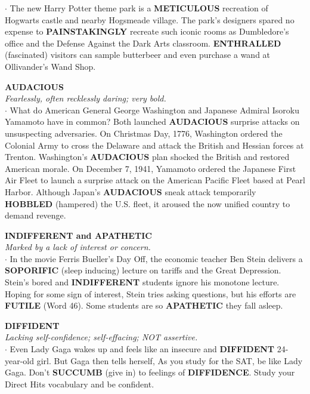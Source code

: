 \documentclass{exam}
\begin{document}
\begin{questions}
$\cdot$ The new Harry Potter theme park is a \textbf{METICULOUS}
recreation of Hogwarts castle and nearby Hogsmeade
village. The park's designers spared no expense to
\textbf{PAINSTAKINGLY} recreate such iconic rooms as
Dumbledore's office and the Defense Against the Dark
Arts classroom. \textbf{ENTHRALLED} (fascinated) visitors
can sample butterbeer and even purchase a wand at
Ollivander's Wand Shop.

\question \textbf{AUDACIOUS}\\
\textit{Fearlessly, often recklessly daring; very bold.}\\

$\cdot$ What do American General George Washington and
Japanese Admiral Isoroku Yamamoto have in
common? Both launched \textbf{AUDACIOUS} surprise
attacks on unsuspecting adversaries. On Christmas
Day, 1776, Washington ordered the Colonial Army to
cross the Delaware and attack the British and Hessian
forces at Trenton. Washington's \textbf{AUDACIOUS} plan
shocked the British and restored American morale.
On December 7, 1941, Yamamoto ordered the
Japanese First Air Fleet to launch a surprise attack on
the American Pacific Fleet based at Pearl Harbor.
Although Japan's \textbf{AUDACIOUS} sneak attack
temporarily \textbf{HOBBLED} (hampered) the U.S. fleet, it
aroused the now unified country to demand revenge.

\question  \textbf{INDIFFERENT and APATHETIC}\\ \textit{Marked by a lack of interest or concern.}\\

$\cdot$ In the movie Ferris Bueller's Day Off, the economic
teacher Ben Stein delivers a \textbf{SOPORIFIC} (sleep inducing) lecture on tariffs and the Great Depression.
Stein's bored and \textbf{INDIFFERENT} students ignore his
monotone lecture. Hoping for some sign of interest,
Stein tries asking questions, but his efforts are
\textbf{FUTILE} (Word 46). Some students are so
\textbf{APATHETIC} they fall asleep.

\question \textbf{DIFFIDENT}\\
\textit{Lacking self-confidence; self-effacing; NOT assertive.}\\

$\cdot$ Even Lady Gaga wakes up and feels like an insecure and \textbf{DIFFIDENT} 24-year-old girl. But Gaga then tells herself,  As you study for the SAT, be like Lady
Gaga. Don't \textbf{SUCCUMB} (give in) to feelings of
\textbf{DIFFIDENCE}. Study your Direct Hits vocabulary and
be confident.


\end{questions}
\end{document}
